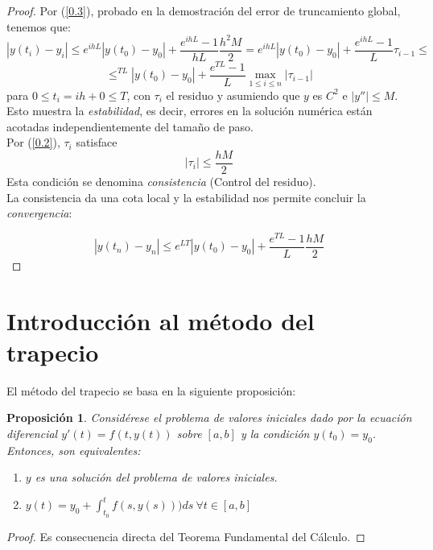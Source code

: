\documentclass{article}
\theoremstyle{theorem-style}  %
\newtheorem{proposition}[theorem]{Proposición}
\theoremstyle{definition-style}
\theoremstyle{example-style}
\begin{document}
	\begin{proof}
		Por (\ref{0.3}), probado en la demostración del error de truncamiento global, tenemos que:
		$$|y(t_i)-y_i| \le e^{ihL}|y(t_0)-y_0|+\frac{e^{ihL}-1}{hL}\frac{h^2M}{2} = e^{ihL}|y(t_0)-y_0|+\frac{e^{ihL}-1}{L}\tau_{i-1} \le $$ $$ \le^{TL}|y(t_0)-y_0|+\frac{e^{TL}-1}{L}\max_{1 \le i \le n} |\tau_{i-1}|$$
		para $0 \le t_i=ih+0 \le T$, con $\tau_i$ el residuo y asumiendo que $y$ es $C^2$ e $|y''| \le M$. Esto muestra la \textit{estabilidad}, es decir, errores en la solución numérica están acotadas independientemente del tamaño de paso.\\
		
		Por (\ref{0.2}), $\tau_i$ satisface
		$$|\tau_i|\le \frac{hM}{2}$$
		Esta condición se denomina \textit{consistencia} (Control del residuo).\\
		
		La consistencia da una cota local y la estabilidad nos permite concluir la \textit{convergencia}:
		
		$$|y(t_n)-y_n| \le e^{LT}|y(t_0)-y_0|+\frac{e^{TL}-1}{L}\frac{hM}{2}$$ 
	\end{proof}
	

\section{Introducción al método del trapecio} \label{sec:intro-trapecio}

	El método del trapecio se basa en la siguiente proposición:

	\begin{proposition} \label{prop:sol-eq}
		Considérese el problema de valores iniciales dado por la ecuación diferencial $y'(t) = f(t,y(t))$ sobre $[a,b]$ y la condición $y(t_0) = y_0$.  Entonces, son equivalentes:
		\begin{enumerate}
			\item $y$ es una solución del problema de valores iniciales.
			\item $y(t) = y_0 + \int_{t_0}^{t} f(s,y(s))) ds \ \forall t \in [a,b]$
		\end{enumerate}
	\end{proposition}
	
	\begin{proof}
		Es consecuencia directa del Teorema Fundamental del Cálculo.
	\end{proof}
\end{document}
